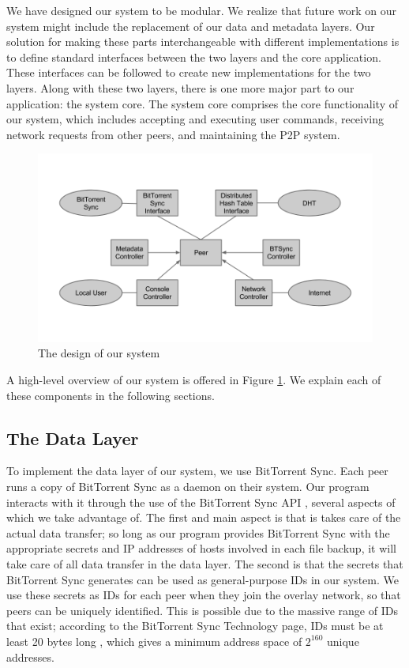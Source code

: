 \documentclass[12pt]{report}
\begin{document}
We have designed our system to be modular. We realize that future work on our system might include the replacement of our data and metadata layers. Our solution for making these parts interchangeable with different implementations is to define standard interfaces between the two layers and the core application. These interfaces can be followed to create new implementations for the two layers. Along with these two layers, there is one more major part to our application: the system core. The system core comprises the core functionality of our system, which includes accepting and executing user commands, receiving network requests from other peers, and maintaining the P2P system.

\begin{figure}
  \centering
  \includegraphics[scale=0.4]{figures/SystemDesign}
  \caption{The design of our system \label{fig:SystemDesign}}
\end{figure}

A high-level overview of our system is offered in Figure \ref{fig:SystemDesign}. We explain each of these components in the following sections.

\subsection{The Data Layer}
To implement the data layer of our system, we use BitTorrent Sync. Each peer runs a copy of BitTorrent Sync as a daemon on their system. Our program interacts with it through the use of the BitTorrent Sync API \cite{btsyncapi}, several aspects of which we take advantage of. The first and main aspect is that is takes care of the actual data transfer; so long as our program provides BitTorrent Sync with the appropriate secrets and IP addresses of hosts involved in each file backup, it will take care of all data transfer in the data layer. The second is that the secrets that BitTorrent Sync generates can be used as general-purpose IDs in our system. We use these secrets as IDs for each peer when they join the overlay network, so that peers can be uniquely identified. This is possible due to the massive range of IDs that exist; according to the BitTorrent Sync Technology page, IDs must be at least 20 bytes long \cite{btsynctech}, which gives a minimum address space of $2^{160}$ unique addresses.
\end{document}
